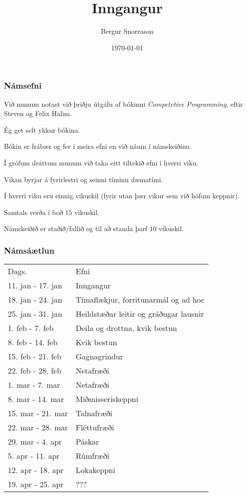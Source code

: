 

\title{Inngangur}
\author{Bergur Snorrason}
\date{\today}



\frame{\titlepage}

{
	\frametitle{Námsefni}
	{
		\item<1-> Við munum notast við þriðju útgáfu af bókinni \emph{Competetive Programming}, eftir Steven og Felix Halim.
		\item<2-> Ég get selt ykkur bókina.
		\item<3-> Bókin er frábær og fer í meira efni en við náum í námskeiðinu.
		\item<4-> Í grófum dráttum munum við taka eitt tiltekið efni í hverri viku.
		\item<5-> Vikan byrjar á fyrirlestri og seinni tíminn dæmatími.
		\item<6-> Í hverri viku eru einnig vikuskil (fyrir utan þær vikur sem við höfum keppnir).
		\item<7-> Samtals verða í boð $15$ vikuskil.
		\item<8-> Námskeiðið er staðið/fallið og til að standa þarf $10$ vikuskil.
	}
}

{
	\frametitle{Námsáætlun}
	\begin{tabular}{l l}
		Dags. & Efni\\
		11. jan - 17. jan & Inngangur\\
		18. jan - 24. jan & Tímaflækjur, forritunarmál og ad hoc\\
		25. jan - 31. jan & Heildstæðar leitir og gráðugar lausnir\\
		1. feb - 7. feb & Deila og drottna, kvik bestun\\
		8. feb - 14. feb & Kvik bestun\\
		15. feb - 21. feb & Gagnagrindur\\
		22. feb - 28. feb & Netafræði\\
		1. mar - 7. mar & Netafræði\\
		8. mar - 14. mar & Miðmisseriskeppni\\
		15. mar - 21. mar & Talnafræði\\
		22. mar - 28. mar & Fléttufræði\\
		29. mar - 4. apr & Páskar\\
		5. apr - 11. apr & Rúmfræði\\
		12. apr - 18. apr & Lokakeppni\\
		19. apr - 25. apr & ???
	\end{tabular}
}

